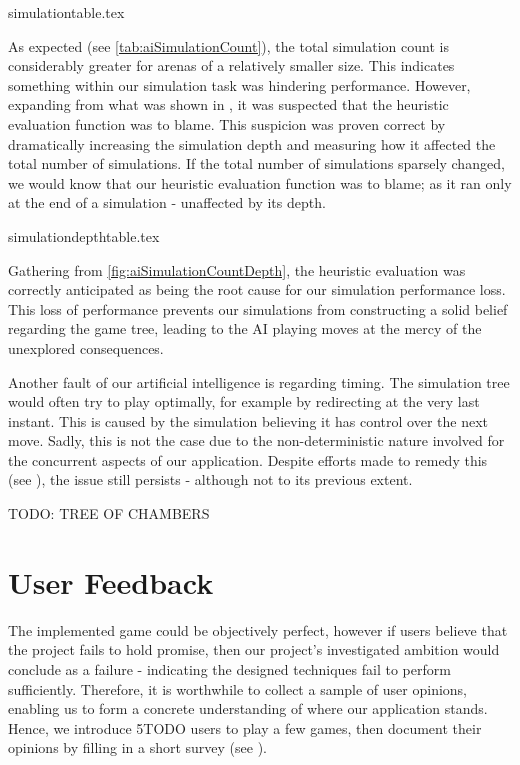 \documentclass{standalone}
\begin{document}
		{simulationtable.tex}

	 	As expected (see \autoref{tab:aiSimulationCount}), the total simulation count is considerably greater for arenas of a relatively smaller size. This indicates something within our simulation task was hindering performance. However, expanding from what was shown in , it was suspected that the heuristic evaluation function was to blame. This suspicion was proven correct by dramatically increasing the simulation depth and measuring how it affected the total number of simulations. If the total number of simulations sparsely changed, we would know that our heuristic evaluation function was to blame; as it ran only at the end of a simulation - unaffected by its depth.

		{simulationdepthtable.tex}

		Gathering from \autoref{fig:aiSimulationCountDepth}, the heuristic evaluation was correctly anticipated as being the root cause for our simulation performance loss. This loss of performance prevents our simulations from constructing a solid belief regarding the game tree, leading to the AI playing moves at the mercy of the unexplored consequences.

		Another fault of our artificial intelligence is regarding timing. The simulation tree would often try to play optimally, for example by redirecting at the very last instant. This is caused by the simulation believing it has control over the next move. Sadly, this is not the case due to the non-deterministic nature involved for the concurrent aspects of our application. Despite efforts made to remedy this (see ), the issue still persists - although not to its previous extent.

		TODO: TREE OF CHAMBERS


	\section{User Feedback} \label{sec:userFeedback}
		The implemented game could be objectively perfect, however if users believe that the project fails to hold promise, then our project's investigated ambition would conclude as a failure - indicating the designed techniques fail to perform sufficiently. Therefore, it is worthwhile to collect a sample of user opinions, enabling us to form a concrete understanding of where our application stands. Hence, we introduce 5TODO users to play a few games, then document their opinions by filling in a short survey (see ).
\end{document}
